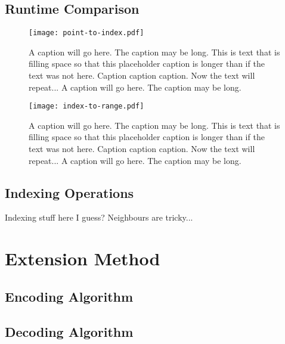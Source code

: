 \subsection{Runtime Comparison}


\begin{figure}[htp!]
	\centering
	\texttt{[image: point-to-index.pdf]}
	\caption[Runtime comparison of SDOG point encoding algorithms]{
		A caption will go here.
		The caption may be long.
		This is text that is filling space so that this placeholder caption is longer than if the text was not here.
		Caption caption caption.
		Now the text will repeat...
		A caption will go here.
		The caption may be long.
	}
	\label{fig:point-to-index}
\end{figure}


\begin{figure}[htp!]
	\centering
	\texttt{[image: index-to-range.pdf]}
	\caption[Runtime comparison of SDOG decoding algorithms]{
		A caption will go here.
		The caption may be long.
		This is text that is filling space so that this placeholder caption is longer than if the text was not here.
		Caption caption caption.
		Now the text will repeat...
		A caption will go here.
		The caption may be long.
	}
	\label{fig:index-to-range}
\end{figure}


\subsection{Indexing Operations}
Indexing stuff here I guess?
Neighbours are tricky...


\section{Extension Method}


\subsection{Encoding Algorithm}


\subsection{Decoding Algorithm}


